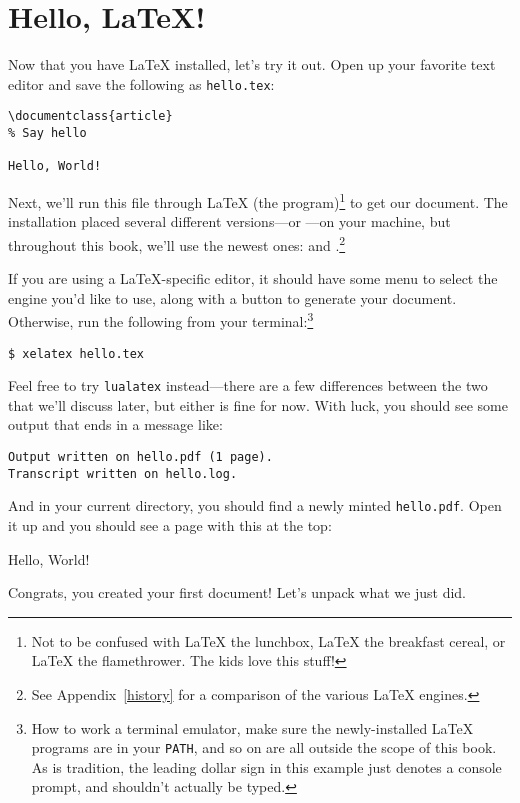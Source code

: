 \chapter{Hello, \texorpdfstring{\LaTeX}{LaTeX}!}
\label{hello}

Now that you have \LaTeX{} installed,
let's try it out.
Open up your favorite text editor and save the following as \texttt{hello.tex}:
\begin{leftfigure}
\begin{lstlisting}
\documentclass{article}
% Say hello

Hello, World!

\end{lstlisting}
\end{leftfigure}
Next, we'll run this file through \LaTeX{} (the program)\footnote{Not to be
confused with \LaTeX{} the lunchbox, \LaTeX{} the breakfast cereal,
or \LaTeX{} the flamethrower. The kids love this stuff!}
to get our document.
The installation placed several different versions---or
---on your machine,
but throughout this book, we'll use the newest ones:
\LuaLaTeX{} and \XeLaTeX.\punckern\footnote{See Appendix~\ref{history} for a
comparison of the various \LaTeX{} engines.}

If you are using a \LaTeX{}-specific editor, it should have some menu
to select the engine you'd like to use,
along with a button to generate your document.
Otherwise, run the following from your terminal:\footnote{%
How to work a terminal emulator,
make sure the newly-installed \LaTeX{} programs are in your \texttt{PATH},
and so on are all outside the scope of this book.
As is tradition, the leading dollar sign in this example just denotes a console
prompt, and shouldn't actually be typed.}
\begin{leftfigure}
\begin{lstlisting}
$ xelatex hello.tex
\end{lstlisting}
\end{leftfigure}
Feel free to try \texttt{lualatex} instead---there are a few differences
between the two that we'll discuss later, but either is fine for now.
With luck, you should see some output that ends in a message like:
\begin{leftfigure}
\begin{lstlisting}
Output written on hello.pdf (1 page).
Transcript written on hello.log.
\end{lstlisting}
\end{leftfigure}
And in your current directory, you should find a newly minted \texttt{hello.pdf}.
Open it up and you should see a page with this at the top:
\begin{leftfigure}
\lm Hello, World!
\end{leftfigure}
Congrats,
you created your first document!
Let's unpack what we just did.

